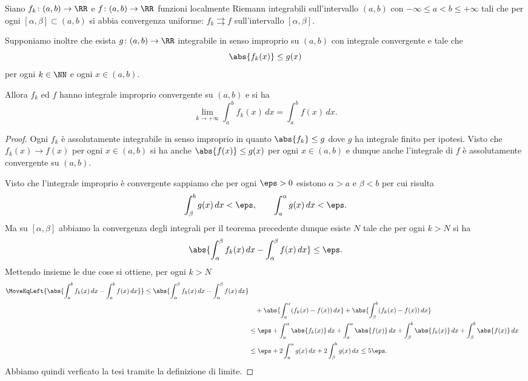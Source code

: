 \begin{theorem}%
  \label{th:convergenza_dominata_uniforme}%
%
  Siano $f_k\colon (a,b) \to \RR$ e $f\colon (a,b)\to \RR$ funzioni 
  localmente Riemann integrabili
  sull'intervallo $(a,b)$ con $-\infty \le a < b \le +\infty$
  tali che per ogni $[\alpha,\beta]\subset (a,b)$ 
  si abbia convergenza uniforme: $f_k\rightrightarrows f$ 
  sull'intervallo $[\alpha,\beta]$.
  
  Supponiamo inoltre che esista $g\colon (a,b)\to \RR$
  integrabile in senso improprio su $(a,b)$ con integrale convergente e tale
  che
  \[
  \abs{f_k(x)}\le g(x)
  \]
  per ogni $k\in \NN$ e ogni $x\in (a,b)$.
    
  Allora $f_k$ ed $f$ hanno integrale improprio convergente su $(a,b)$ e si ha
  \[
    \lim_{k\to+\infty} \int_a^b f_k(x)\, dx = \int_a^b f(x)\, dx.
  \]
\end{theorem}
%
\begin{proof}
  Ogni $f_k$ è assolutamente integrabile in senso improprio in quanto
  $\abs{f_k}\le g$ dove $g$ ha integrale finito per ipotesi.
  Visto che $f_k(x)\to f(x)$ per ogni  $x\in (a,b)$
  si ha anche $\abs{f(x)}\le g(x)$ per ogni $x\in (a,b)$ 
  e dunque anche l'integrale di $f$ è assolutamente convergente su $(a,b)$.
  
  Visto che l'integrale improprio è convergente sappiamo che 
  per ogni $\eps>0$ esistono $\alpha>a$ e $\beta<b$ per cui risulta
  \[
    \int_\beta^b g(x)\, dx < \eps, \qquad 
    \int_a^\alpha g(x)\, dx < \eps.
  \]
  Ma su $[\alpha ,\beta]$ abbiamo la convergenza degli integrali per il teorema precedente
  dunque esiste $N$ tale che per ogni $k > N$ si ha 
  \[
   \abs{\int_\alpha^\beta f_k(x)\, dx - \int_\alpha^\beta f(x)\, dx} \le \eps. 
  \]
  Mettendo insieme le due cose si ottiene,
  per ogni $k>N$
  \begin{align*}
    \MoveEqLeft{\abs{\int_a^b f_k(x)\, dx - \int_a^b f(x)\, dx}} \le \abs{\int_\alpha^\beta f_k(x)\, dx - \int_\alpha^\beta f(x)\, dx} \\
    & \quad + \abs{\int_a^\alpha (f_k(x) - f(x))\, dx }
      + \abs{\int_\beta^b (f_k(x) - f(x))\, dx } \\
    &\le \eps 
    + \int_a^\alpha \abs{f_k(x)}\, dx + \int_a^\alpha\abs{f(x)}\, dx
    + \int_\beta^b \abs{f_k(x)}\, dx + \int_\beta^b\abs{f(x)}\, dx\\
    &\le \eps 
    + 2 \int_a^\alpha g(x)\,dx
    + 2 \int_\beta^b g(x)\,dx 
    \le 5 \eps.
  \end{align*}
  Abbiamo quindi verficato la tesi tramite la definizione di limite.
\end{proof}


